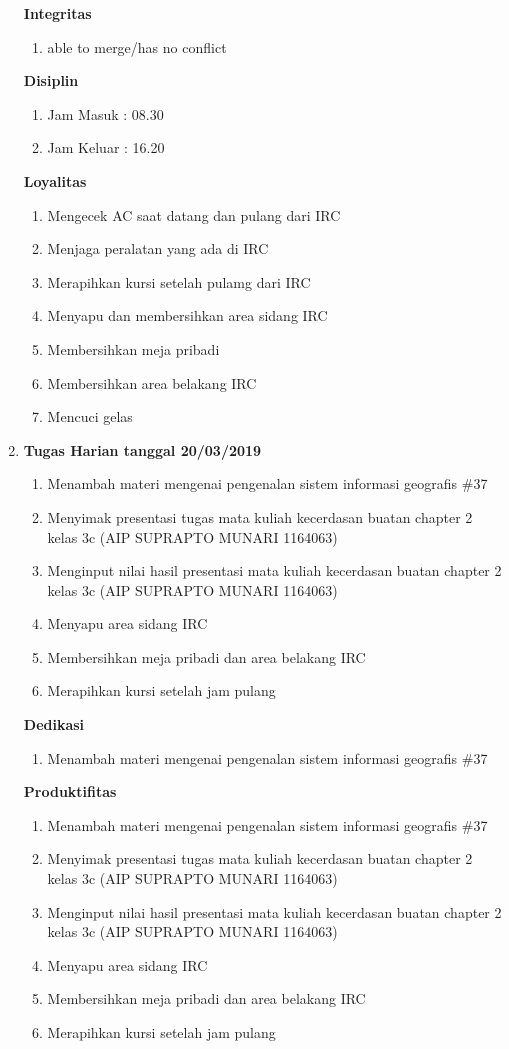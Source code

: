 \begin{enumerate}
\textbf{Integritas}
\begin{enumerate}
\item able to merge/has no conflict
\end{enumerate}

\textbf{Disiplin}
\begin{enumerate}
\item Jam Masuk : 08.30
\item Jam Keluar : 16.20
\end{enumerate}

\textbf{Loyalitas}
\begin{enumerate}
\item Mengecek AC saat datang dan pulang dari IRC
\item Menjaga peralatan yang ada di IRC
\item Merapihkan kursi setelah pulamg dari IRC
\item Menyapu dan membersihkan area sidang IRC
\item Membersihkan meja pribadi
\item Membersihkan area belakang IRC
\item Mencuci gelas
\end{enumerate}

\item \textbf{Tugas Harian tanggal 20/03/2019}
\begin{enumerate}
\item Menambah materi mengenai pengenalan sistem informasi geografis \#37
\item Menyimak presentasi tugas mata kuliah kecerdasan buatan chapter 2 kelas 3c (AIP SUPRAPTO MUNARI 1164063)
\item Menginput nilai hasil presentasi mata kuliah kecerdasan buatan chapter 2 kelas 3c (AIP SUPRAPTO MUNARI 1164063)
\item Menyapu area sidang IRC
\item Membersihkan meja pribadi dan area belakang IRC
\item Merapihkan kursi setelah jam pulang 
\end{enumerate}

\textbf{Dedikasi}
\begin{enumerate}
\item Menambah materi mengenai pengenalan sistem informasi geografis \#37
\end{enumerate}

\textbf{Produktifitas}
\begin{enumerate}
\item Menambah materi mengenai pengenalan sistem informasi geografis \#37
\item Menyimak presentasi tugas mata kuliah kecerdasan buatan chapter 2 kelas 3c (AIP SUPRAPTO MUNARI 1164063)
\item Menginput nilai hasil presentasi mata kuliah kecerdasan buatan chapter 2 kelas 3c (AIP SUPRAPTO MUNARI 1164063)
\item Menyapu area sidang IRC
\item Membersihkan meja pribadi dan area belakang IRC
\item Merapihkan kursi setelah jam pulang 
\end{enumerate}


\end{enumerate}
